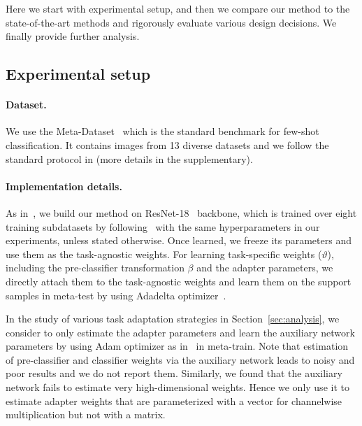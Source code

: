 


Here we start with experimental setup, and
then we compare our method to the state-of-the-art methods and rigorously evaluate various design decisions.
We finally provide further analysis.

\subsection{Experimental setup}
\paragraph{Dataset.} We use the Meta-Dataset~\cite{triantafillou2019meta} which is the standard benchmark for few-shot classification.
It contains images from 13 diverse datasets and we follow the standard protocol in \cite{triantafillou2019meta} (more details in the supplementary).

\paragraph{Implementation details.}
As in~\cite{dvornik2020selecting,bateni2020improved,li2021universal}, we build our method on ResNet-18~\cite{he2016deep} backbone, which is trained over eight training subdatasets by following~\cite{li2021universal}  with the same hyperparameters in our experiments, unless stated otherwise.
Once learned, we freeze its parameters and use them as the task-agnostic weights.
For learning task-specific weights ($\vartheta$), including the pre-classifier transformation $\beta$ and the adapter parameters, we directly attach them to the task-agnostic weights and learn them on the support samples in meta-test by using Adadelta optimizer~\cite{zeiler2012adadelta}. 

In the study of various task adaptation strategies in Section~\ref{sec:analysis}, we consider to only estimate the adapter parameters and learn the auxiliary network parameters by using Adam optimizer as in~\cite{requeima2019fast,bateni2020improved} in meta-train.
Note that estimation of pre-classifier and classifier weights via the auxiliary network leads to noisy and poor results and we do not report them.
Similarly, we found that the auxiliary network fails to estimate very high-dimensional weights.
Hence we only use it to estimate adapter weights that are parameterized with a vector for channelwise multiplication but not with a matrix.

